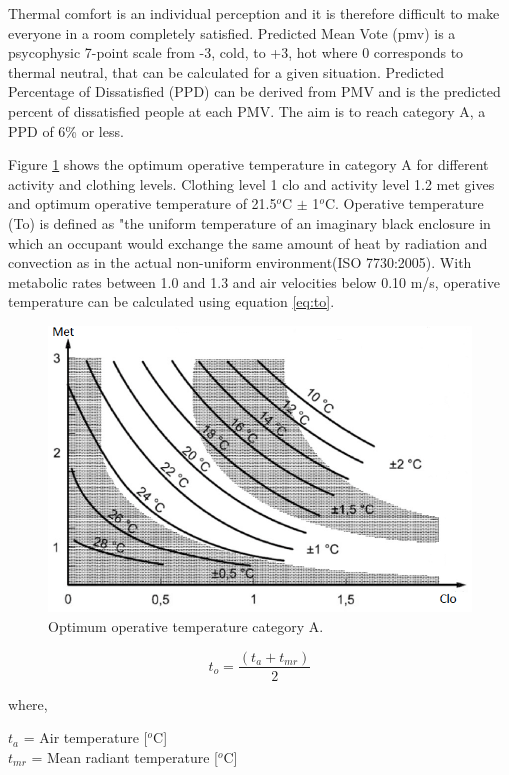 Thermal comfort is an individual perception and it is therefore difficult to make everyone in a room completely satisfied. Predicted Mean Vote (\ac{pmv}) is a psycophysic 7-point scale from -3, cold, to +3, hot where 0 corresponds to thermal neutral, that can be calculated for a given situation. Predicted Percentage of Dissatisfied (\ac{PPD}) can be derived from PMV and is the predicted percent of dissatisfied people at each PMV. The aim is to reach category A, a PPD of 6\% or less. 

Figure \ref{fig:opt} shows the optimum operative temperature in category A for different activity and clothing levels. Clothing level 1 clo and activity level 1.2 met gives and optimum operative temperature of 21.5$^o$C $\pm$ 1$^o$C. Operative temperature (\ac{To}) is defined as "the uniform temperature of an imaginary black enclosure in which an occupant would exchange the same amount of heat by radiation and convection as in the actual non-uniform environment(ISO 7730:2005). With metabolic rates between 1.0 and 1.3 and air velocities below 0.10 m/s, operative temperature can be calculated using equation \ref{eq:to}. 

\begin{figure}[h!]
    \centering
    \includegraphics[scale=0.6]{vedlegg/opt.png}
    \caption{Optimum operative temperature category A.}
    \label{fig:opt}
\end{figure}

\begin{equation}\label{eq:to}
    t_o = \frac{(t_a+t_{mr})}{2}
\end{equation}

where,

$t_a$ \hspace{1mm} = Air temperature [$^o$C] \\
$t_{mr}$ = Mean radiant temperature [$^o$C] \\




